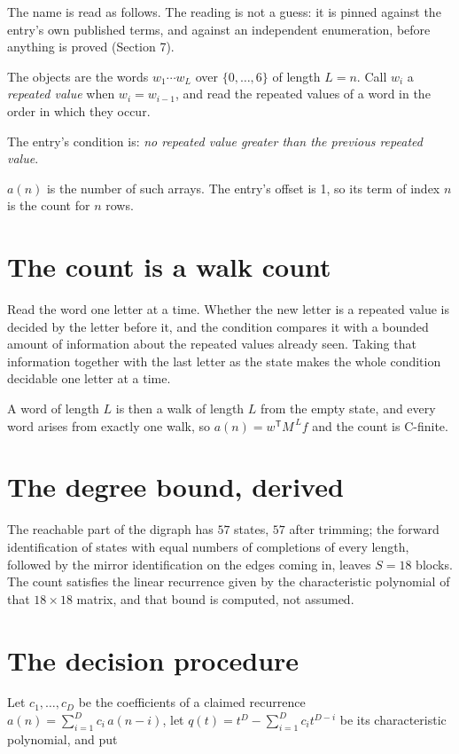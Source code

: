 \documentclass[11pt]{article}
\theoremstyle{definition}
\begin{document}
The name is read as follows. The reading is not a guess: it is pinned against the entry's own published terms, and against an independent enumeration, before anything is proved (Section 7).

The objects are the words $w_1\cdots w_L$ over $\{0,\dots,6\}$ of length $L = n$. Call $w_i$ a {\itshape repeated value} when $w_i = w_{i-1}$, and read the repeated values of a word in the order in which they occur.

The entry's condition is: {\itshape no repeated value greater than the previous repeated value}.

$a(n)$ is the number of such arrays. The entry's offset is 1, so its term of index $n$ is the count for $n$ rows.

\section{The count is a walk count}

Read the word one letter at a time. Whether the new letter is a repeated value is decided by the letter before it, and the condition compares it with a bounded amount of information about the repeated values already seen. Taking that information together with the last letter as the state makes the whole condition decidable one letter at a time.

A word of length $L$ is then a walk of length $L$ from the empty state, and every word arises from exactly one walk, so $a(n) = w^{\mathsf T}M^{\,L}f$ and the count is C-finite.

\section{The degree bound, derived}

The reachable part of the digraph has $57$ states, $57$ after trimming; the forward identification of states with equal numbers of completions of every length, followed by the mirror identification on the edges coming in, leaves $S = 18$ blocks. The count satisfies the linear recurrence given by the characteristic polynomial of that $18\times18$ matrix, and that bound is computed, not assumed.

\section{The decision procedure}

Let $c_1,\dots,c_D$ be the coefficients of a claimed recurrence $a(n) = \sum_{i=1}^{D} c_i\,a(n-i)$, let $q(t) = t^{D} - \sum_{i=1}^{D} c_i t^{D-i}$ be its characteristic polynomial, and put
\end{document}
